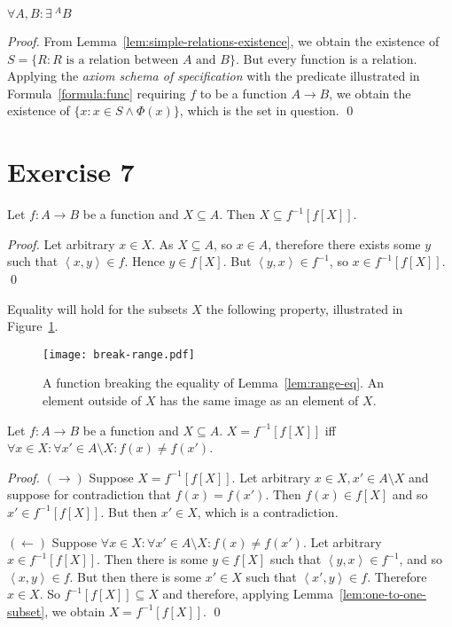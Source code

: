 \documentclass[11pt]{llncs}
\begin{document}
\begin{lemma}
  $\forall A, B: \exists ~^A B$
\end{lemma}
\begin{proof}
  From Lemma~\ref{lem:simple-relations-existence}, we obtain the existence of
  $S = \{R: R \text{ is a relation between } A \text{ and } B\}$. But every
  function is a relation. Applying the \emph{axiom schema of specification} with
  the predicate illustrated in Formula~\ref{formula:func} requiring $f$ to be a
  function $A \longrightarrow B$, we obtain the existence of $\{x: x \in S
  \land \Phi(x)\}$, which is the set in question.
  \qed
\end{proof}

\section*{Exercise 7}
\begin{lemma}\label{lem:one-to-one-subset}
  Let $f: A \longrightarrow B$ be a function and $X \subseteq A$. Then
  $X \subseteq f^{-1}[f[X]]$.
\end{lemma}
\begin{proof}
  Let arbitrary $x \in X$. As $X \subseteq A$, so $x \in A$, therefore there
  exists some $y$ such that $\left<x, y\right> \in f$. Hence $y \in f[X]$.
  But $\left<y, x\right> \in f^{-1}$, so $x \in f^{-1}[f[X]]$.
  \qed
\end{proof}

Equality will hold for the subsets $X$ the following property, illustrated in
Figure~\ref{fig:break-range}.

\begin{figure}[H]\label{fig:break-range}
    \caption{A function breaking the equality of Lemma~\ref{lem:range-eq}.
             An element outside of $X$ has the same image as an element of $X$.}
    \centering
    \texttt{[image: break-range.pdf]}
\end{figure}

\begin{lemma}\label{lem:range-eq}
  Let $f: A \longrightarrow B$ be a function and $X \subseteq A$.
  $X = f^{-1}[f[X]]$
  iff
  $\forall x \in X: \forall x' \in A \setminus X: f(x) \neq f(x')$.
\end{lemma}
\begin{proof}
  \item $(\rightarrow)$
  Suppose $X = f^{-1}[f[X]]$.
  Let arbitrary $x \in X, x' \in A \setminus X$ and suppose for contradiction
  that $f(x) = f(x')$. Then $f(x) \in f[X]$ and so $x' \in f^{-1}[f[X]]$.
  But then $x' \in X$, which is a contradiction.

  \item $(\leftarrow)$
  Suppose
  $\forall x \in X: \forall x' \in A \setminus X: f(x) \neq f(x')$.
  Let arbitrary $x \in f^{-1}[f[X]]$. Then there is some $y \in f[X]$ such that
  $\left<y, x\right> \in f^{-1}$, and so $\left<x, y\right> \in f$. But then
  there is some $x' \in X$ such that $\left<x', y\right> \in f$. Therefore $x
  \in X$. So $f^{-1}[f[X]] \subseteq X$ and therefore, applying
  Lemma~\ref{lem:one-to-one-subset}, we obtain $X = f^{-1}[f[X]]$.
  \qed
\end{proof}
\end{document}
